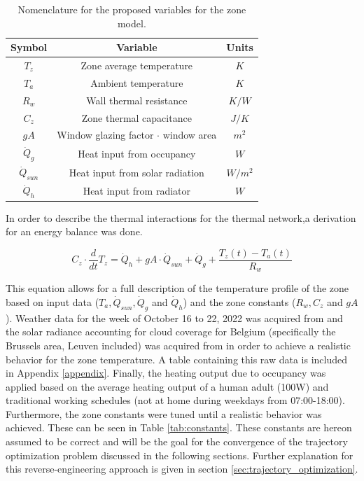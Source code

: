 \begin{table}[H]
\centering
\begin{tabular}{c|c|c}
Symbol & Variable & Units \\
\hline
\hline
$T_z$ & Zone average temperature & $K$\\
$T_a$ & Ambient temperature & $K$\\
$R_w$ & Wall thermal resistance & $K/W$\\
$C_z$ & Zone thermal capacitance & $J/K$\\
$gA$ & Window glazing factor $\cdot$ window area & $m^2$\\
$\dot{Q}_g$ & Heat input from occupancy & $W$\\
$\dot{Q}_{sun}$ & Heat input from solar radiation & $W/m^2$\\
$\dot{Q}_h$ & Heat input from radiator & $W$
\end{tabular}
\caption{Nomenclature for the proposed variables for the zone model.}
\label{tab:nomenclature_model}
\end{table}

In order to describe the thermal interactions for the thermal network,a derivation for an energy balance was done.

\begin{equation}
C_z \cdot \frac{d}{dt} T_z = \dot{Q}_h + gA \cdot \dot{Q}_{sun} + \dot{Q}_g + \frac{T_z(t)-T_a(t)}{R_w}
\label{eq:energy_balance}
\end{equation}

This equation allows for a full description of the temperature profile of the zone based on input data ($T_a, \dot{Q}_{sun}, \dot{Q}_g$ and $\dot{Q}_h$) and the zone constants ($R_w, C_z$ and $gA$). Weather data for the week of October 16 to 22, 2022 was acquired from \cite{nooa_2022} and the solar radiance accounting for cloud coverage for Belgium (specifically the Brussels area, Leuven included) was acquired from \cite{kunstmann} in order to achieve a realistic behavior for the zone temperature. A table containing this raw data is included in Appendix \ref{appendix}. Finally, the heating output due to occupancy was applied based on the average heating output of a human adult (100W) and traditional working schedules (not at home during weekdays from 07:00-18:00). \\

Furthermore, the zone constants were tuned until a realistic behavior was achieved. These can be seen in Table \ref{tab:constants}. These constants are hereon assumed to be correct and will be the goal for the convergence of the trajectory optimization problem discussed in the following sections. Further explanation for this reverse-engineering approach is given in section \ref{sec:trajectory_optimization}.

